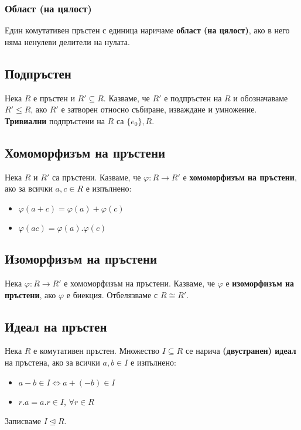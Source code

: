 \documentclass[fleqn,12pt]{article}
\begin{document}
\subsubsection{Област (на цялост)}
Един комутативен пръстен с единица наричаме \textbf{област (на цялост)}, ако в него
няма ненулеви делители на нулата.

\subsection{Подпръстен}
Нека $R$ е пръстен и $R' \subseteq R$. Казваме, че $R'$ е подпръстен на $R$ и 
обозначаваме $R' \leq R$, ако $R'$ е затворен относно събиране, изваждане и умножение.
\textbf{Тривиални} подпръстени на $R$ са $\{e_0\}, R$.

\subsection{Хомоморфизъм на пръстени}
Нека $R$ и $R'$ са пръстени. Казваме, че $\varphi : R \rightarrow R'$ е \textbf{хомоморфизъм на пръстени},
ако за всички $a,c \in R$ е изпълнено:
\begin{itemize}
    \item $\varphi(a + c) = \varphi(a) + \varphi(c)$
    \item $\varphi(ac) = \varphi(a) . \varphi(c)$
\end{itemize}

\subsection{Изоморфизъм на пръстени}
Нека $\varphi : R \rightarrow R'$ е хомоморфизъм на пръстени.
Казваме, че $\varphi$ е \textbf{изоморфизъм на пръстени}, ако $\varphi$ е биекция.
Отбелязваме с $R \cong R'$.

\subsection{Идеал на пръстен}
Нека $R$ е комутативен пръстен. Множество $I \subseteq R$ се нарича
\textbf{(двустранен) идеал} на пръстена, ако за всички $a,b \in I$ е изпълнено:
\begin{itemize}
    \item $a - b \in I \Leftrightarrow a + (-b) \in I$
    \item \label{ideal:cond_2} $r.a = a.r \in I$, $\forall r \in R$
\end{itemize}

Записваме $I \trianglelefteq R$.
\end{document}
